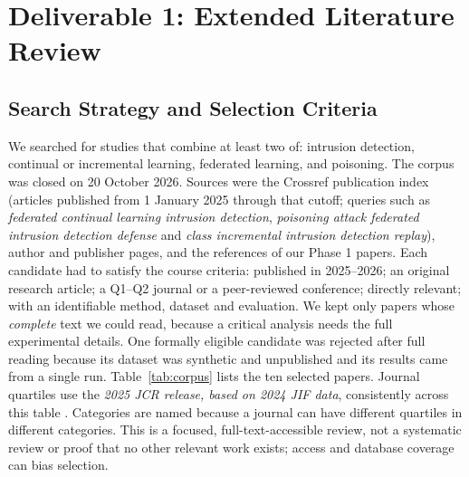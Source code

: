 \documentclass[10pt,a4paper]{article}
\begin{document}
\section{Deliverable 1: Extended Literature Review}

\subsection{Search Strategy and Selection Criteria}
We searched for studies that combine at least two of: intrusion detection, continual or incremental learning, federated learning, and poisoning. The corpus was closed on 20 October 2026. Sources were the Crossref publication index (articles published from 1 January 2025 through that cutoff; queries such as \emph{federated continual learning intrusion detection}, \emph{poisoning attack federated intrusion detection defense} and \emph{class incremental intrusion detection replay}), author and publisher pages, and the references of our Phase 1 papers. Each candidate had to satisfy the course criteria: published in 2025--2026; an original research article; a Q1--Q2 journal or a peer-reviewed conference; directly relevant; with an identifiable method, dataset and evaluation. We kept only papers whose \emph{complete} text we could read, because a critical analysis needs the full experimental details. One formally eligible candidate was rejected after full reading because its dataset was synthetic and unpublished and its results came from a single run. Table~\ref{tab:corpus} lists the ten selected papers. Journal quartiles use the \emph{2025 JCR release, based on 2024 JIF data}, consistently across this table \cite{clarivate,jcrtable}. Categories are named because a journal can have different quartiles in different categories. This is a focused, full-text-accessible review, not a systematic review or proof that no other relevant work exists; access and database coverage can bias selection.
\end{document}
